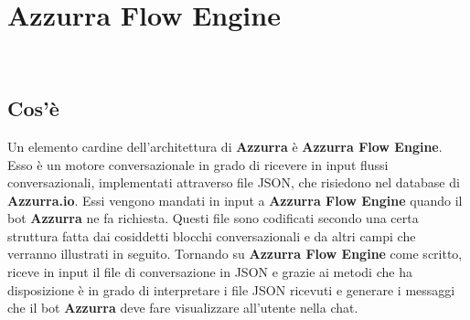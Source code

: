 
\chapter{Azzurra Flow Engine}
\label{cap:flow engine}
\\


\section{Cos'è}
Un elemento cardine dell'architettura di \textbf{Azzurra} è \textbf{Azzurra Flow Engine}. Esso è un motore conversazionale in grado di ricevere in input flussi conversazionali, implementati attraverso file JSON, che risiedono nel database di \textbf{Azzurra.io}. Essi vengono mandati in input a \textbf{Azzurra Flow Engine} quando il bot \textbf{Azzurra} ne fa richiesta. Questi file sono codificati secondo una certa struttura fatta dai cosiddetti blocchi conversazionali e da altri campi che verranno illustrati in seguito. Tornando su \textbf{Azzurra Flow Engine} come scritto, riceve in input il file di conversazione in JSON e grazie ai metodi che ha disposizione è in grado di interpretare i file JSON ricevuti e generare i messaggi che il bot \textbf{Azzurra} deve fare visualizzare all'utente nella chat.

